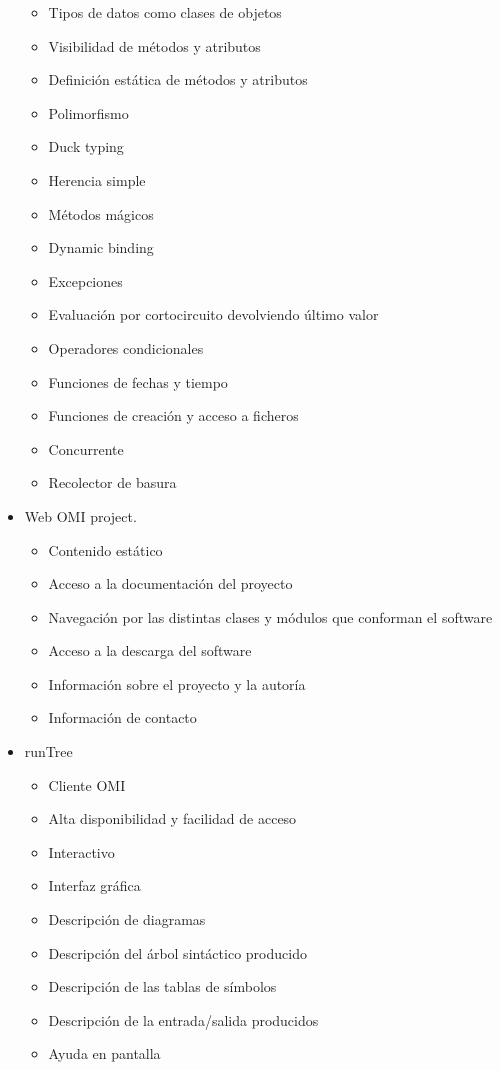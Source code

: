 \begin{itemize}
\begin {itemize}
      \item Tipos de datos como clases de objetos
      \item Visibilidad de métodos y atributos
      \item Definición estática de métodos y atributos
      \item Polimorfismo
      \item Duck typing
      \item Herencia simple
      \item Métodos mágicos
      \item Dynamic binding
      \item Excepciones
      \item Evaluación por cortocircuito devolviendo último valor
      \item Operadores condicionales 
      \item Funciones de fechas y tiempo \\
      \item Funciones de creación y acceso a ficheros
      \item Concurrente
      \item Recolector de basura
   \end{itemize}
   \item Web OMI project.
   \begin{itemize}
      \item Contenido estático
      \item Acceso a la documentación del proyecto
      \item Navegación por las distintas clases y módulos que conforman el software
      \item Acceso a la descarga del software
      \item Información sobre el proyecto y la autoría
      \item Información de contacto
   \end{itemize}
   \item runTree
   \begin{itemize}
      \item Cliente OMI
      \item Alta disponibilidad y facilidad de acceso
      \item Interactivo
      \item Interfaz gráfica
      \item Descripción de diagramas
      \item Descripción del árbol sintáctico producido
      \item Descripción de las tablas de símbolos
      \item Descripción de la entrada/salida producidos
      \item Ayuda en pantalla
   \end{itemize}
\end{itemize}

